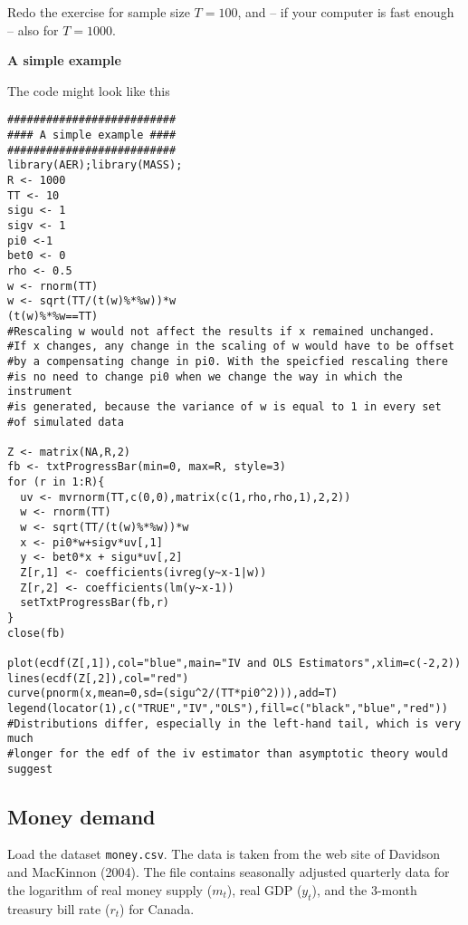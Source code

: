 \documentclass{article}
\begin{document}
Redo the exercise for sample size $T=100$, and -- if your computer is fast
enough -- also for $T=1000$.
\begin{solution}
\textbf{A simple example}

The code might look like this
\begin{verbatim}
##########################
#### A simple example ####
##########################
library(AER);library(MASS);
R <- 1000
TT <- 10
sigu <- 1
sigv <- 1
pi0 <-1
bet0 <- 0
rho <- 0.5
w <- rnorm(TT)
w <- sqrt(TT/(t(w)%*%w))*w
(t(w)%*%w==TT)
#Rescaling w would not affect the results if x remained unchanged.
#If x changes, any change in the scaling of w would have to be offset
#by a compensating change in pi0. With the speicfied rescaling there
#is no need to change pi0 when we change the way in which the instrument
#is generated, because the variance of w is equal to 1 in every set
#of simulated data

Z <- matrix(NA,R,2)
fb <- txtProgressBar(min=0, max=R, style=3)
for (r in 1:R){
  uv <- mvrnorm(TT,c(0,0),matrix(c(1,rho,rho,1),2,2))
  w <- rnorm(TT)
  w <- sqrt(TT/(t(w)%*%w))*w
  x <- pi0*w+sigv*uv[,1]
  y <- bet0*x + sigu*uv[,2]
  Z[r,1] <- coefficients(ivreg(y~x-1|w))
  Z[r,2] <- coefficients(lm(y~x-1))
  setTxtProgressBar(fb,r)
}
close(fb)

plot(ecdf(Z[,1]),col="blue",main="IV and OLS Estimators",xlim=c(-2,2))
lines(ecdf(Z[,2]),col="red")
curve(pnorm(x,mean=0,sd=(sigu^2/(TT*pi0^2))),add=T)
legend(locator(1),c("TRUE","IV","OLS"),fill=c("black","blue","red"))
#Distributions differ, especially in the left-hand tail, which is very much
#longer for the edf of the iv estimator than asymptotic theory would suggest
\end{verbatim}
\end{solution}


\subsection{Money demand\label{mdemand}}

Load the dataset \texttt{money.csv}. The data is taken from the web site of
Davidson and MacKinnon (2004). The file contains seasonally adjusted
quarterly data for the logarithm of real money supply ($m_{t}$), real GDP ($%
y_{t}$), and the 3-month treasury bill rate ($r_{t}$) for Canada.
\end{document}
